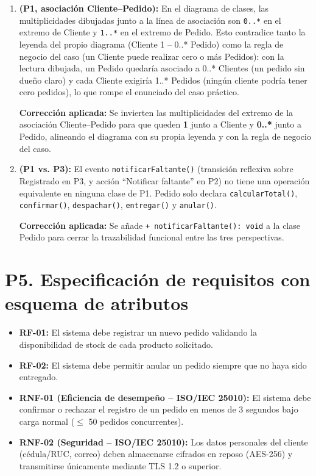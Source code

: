 \documentclass[12pt,a4paper]{article}
\begin{document}
    \begin{enumerate}[label=\textbf{Defecto \arabic*:}]
        \item \textbf{(P1, asociación Cliente--Pedido):} En el diagrama de clases, las multiplicidades dibujadas junto a la línea de asociación son \texttt{0..*} en el extremo de Cliente y \texttt{1..*} en el extremo de Pedido. Esto contradice tanto la leyenda del propio diagrama (Cliente 1 -- 0..* Pedido) como la regla de negocio del caso (un Cliente puede realizar cero o más Pedidos): con la lectura dibujada, un Pedido quedaría asociado a 0..* Clientes (un pedido sin dueño claro) y cada Cliente exigiría 1..* Pedidos (ningún cliente podría tener cero pedidos), lo que rompe el enunciado del caso práctico.
    
        \textbf{Corrección aplicada:} Se invierten las multiplicidades del extremo de la asociación Cliente--Pedido para que queden \textbf{1} junto a Cliente y \textbf{0..*} junto a Pedido, alineando el diagrama con su propia leyenda y con la regla de negocio del caso.
    
        \item \textbf{(P1 vs. P3):} El evento \texttt{notificarFaltante()} (transición reflexiva sobre Registrado en P3, y acción ``Notificar faltante'' en P2) no tiene una operación equivalente en ninguna clase de P1. Pedido solo declara \texttt{calcularTotal()}, \texttt{confirmar()}, \texttt{despachar()}, \texttt{entregar()} y \texttt{anular()}.
    
        \textbf{Corrección aplicada:} Se añade \texttt{+ notificarFaltante(): void} a la clase Pedido para cerrar la trazabilidad funcional entre las tres perspectivas.
    \end{enumerate}
    
    \section{P5. Especificación de requisitos con esquema de atributos}
    
    \begin{itemize}[leftmargin=*]
        \item \textbf{RF-01:} El sistema debe registrar un nuevo pedido validando la disponibilidad de stock de cada producto solicitado.
        \item \textbf{RF-02:} El sistema debe permitir anular un pedido siempre que no haya sido entregado.
        \item \textbf{RNF-01 (Eficiencia de desempeño -- ISO/IEC 25010):} El sistema debe confirmar o rechazar el registro de un pedido en menos de 3 segundos bajo carga normal ($\leq$ 50 pedidos concurrentes).
        \item \textbf{RNF-02 (Seguridad -- ISO/IEC 25010):} Los datos personales del cliente (cédula/RUC, correo) deben almacenarse cifrados en reposo (AES-256) y transmitirse únicamente mediante TLS 1.2 o superior.
    \end{itemize}
    
\end{document}
